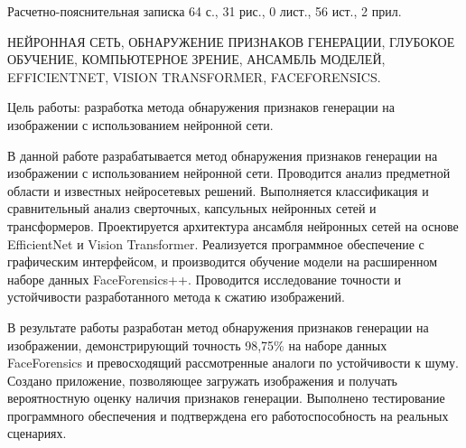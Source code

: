 
Расчетно-пояснительная записка 64 с., 31 рис., 0 лист., 56 ист., 2 прил.

НЕЙРОННАЯ СЕТЬ, ОБНАРУЖЕНИЕ ПРИЗНАКОВ ГЕНЕРАЦИИ, ГЛУБОКОЕ ОБУЧЕНИЕ, КОМПЬЮТЕРНОЕ ЗРЕНИЕ, АНСАМБЛЬ МОДЕЛЕЙ, EFFICIENTNET, VISION TRANSFORMER, FACEFORENSICS.

Цель работы: разработка метода обнаружения признаков генерации на изображении с использованием нейронной сети.

В данной работе разрабатывается метод обнаружения признаков генерации на изображении с использованием нейронной сети. Проводится анализ предметной области и известных нейросетевых решений. Выполняется классификация и сравнительный анализ сверточных, капсульных нейронных сетей и трансформеров. Проектируется архитектура ансамбля нейронных сетей на основе EfficientNet и Vision Transformer. Реализуется программное обеспечение с графическим интерфейсом, и производится обучение модели на расширенном наборе данных FaceForensics++. Проводится исследование точности и устойчивости разработанного метода к сжатию изображений.

В результате работы разработан метод обнаружения признаков генерации на изображении, демонстрирующий точность 98,75\% на наборе данных FaceForensics и превосходящий рассмотренные аналоги по устойчивости к шуму. Создано приложение, позволяющее загружать изображения и получать вероятностную оценку наличия признаков генерации. Выполнено тестирование программного обеспечения и подтверждена его работоспособность на реальных сценариях.

